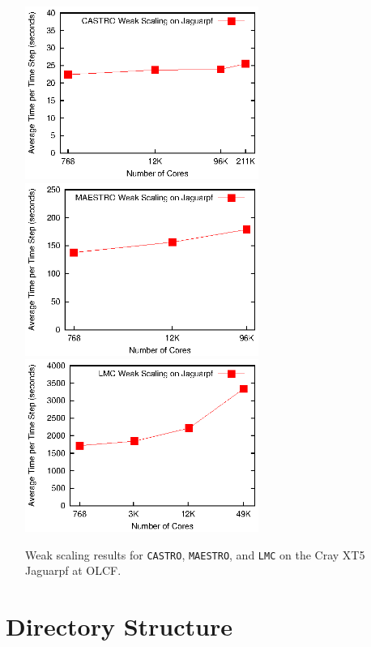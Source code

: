 \begin{figure}[tb]
\centering
\includegraphics[width=3in]{./Introduction/castro_scaling}
\includegraphics[width=3in]{./Introduction/maestro_scaling}
\includegraphics[width=3in]{./Introduction/lmc_scaling}
\caption{\label{fig:scaling}Weak scaling results for {\tt CASTRO}, {\tt MAESTRO}, and
{\tt LMC} on the Cray XT5 Jaguarpf at OLCF.}
\end{figure}

\section{\BoxLib\ Directory Structure}

